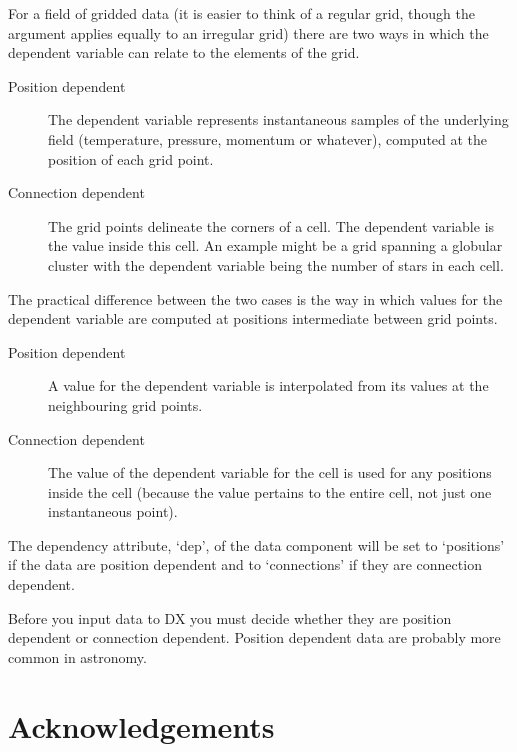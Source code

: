 For a field of gridded data (it is easier to think of a regular grid,
though the argument applies equally to an irregular grid) there are two
ways in which the dependent variable can relate to the elements of the
grid.

\begin{description}

  \item[Position dependent] The dependent variable represents
   instantaneous samples of the underlying field (temperature, pressure,
   momentum or whatever), computed at the position of each grid point.

  \item[Connection dependent] The grid points delineate the corners
   of a cell. The dependent variable is the value inside this cell.
   An example might be a grid spanning a globular cluster with the
   dependent variable being the number of stars in each cell.

\end{description}

The practical difference between the two cases is the way in which
values for the dependent variable are computed at positions intermediate
between grid points.

\begin{description}

  \item[Position dependent] A value for the dependent variable is
   interpolated from its values at the neighbouring grid points.

  \item[Connection dependent] The value of the dependent variable for
   the cell is used for any positions inside the cell (because the
   value pertains to the entire cell, not just one instantaneous
   point).

\end{description}

The dependency attribute, `dep', of the data component will be set to
`positions' if the data are position dependent and to `connections' if
they are connection dependent.

Before you input data to DX you must decide whether they are position
dependent or connection dependent. Position dependent data are probably
more common in astronomy.


\newpage
\section{\label{ACK}Acknowledgements}

